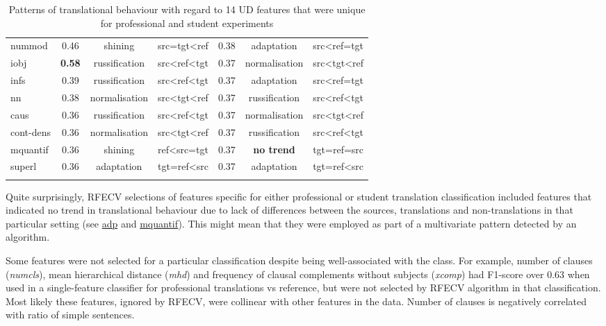 \begin{longtable}[H]{p{1.84cm}|ccc||ccc}
	nummod        & 0.46 & shining       & src=tgt\textless{}ref           & 0.38 & adaptation    & src\textless{}ref=tgt           \\
	iobj          & \textbf{0.58} & russification & src\textless{}ref\textless{}tgt & 0.37 & normalisation & src\textless{}tgt\textless{}ref \\
	infs          & 0.39 & russification & src\textless{}ref\textless{}tgt & 0.37 & adaptation    & src\textless{}ref=tgt           \\
	nn            & 0.38 & normalisation & src\textless{}tgt\textless{}ref & 0.37 & russification & src\textless{}ref\textless{}tgt \\
	caus          & 0.36 & russification & src\textless{}ref\textless{}tgt & 0.37 & normalisation & src\textless{}tgt\textless{}ref \\
	cont-dens & 0.36 & normalisation & src\textless{}tgt\textless{}ref & 0.37 & russification & src\textless{}ref\textless{}tgt \\
	mquantif      & 0.36 & shining       & ref\textless{}src=tgt           & 0.37 & \textbf{no trend}       & tgt=ref=src                     \\
	superl        & 0.36 & adaptation    & tgt=ref\textless{}src           & 0.37 & adaptation    & tgt=ref\textless{}src  \\
	\bottomrule
	\caption{\label{tab:spec_rfecv_feats}Patterns of translational behaviour with regard to 14 UD features that were unique for professional and student experiments}\\
\end{longtable}	

Quite surprisingly, RFECV selections of features specific for either professional or student translation classification included features that indicated no trend in translational behaviour due to lack of differences between the sources, translations and non-translations in that particular setting (see \hyperlink{ft:adp}{adp} and \hyperlink{ft:mquantif}{mquantif}). This might mean that they were employed as part of a multivariate pattern detected by an algorithm.

Some features were not selected for a particular classification despite being well-associated with the class. For example, number of clauses (\textit{numcls}), mean hierarchical distance (\textit{mhd}) and frequency of clausal complements without subjects (\textit{xcomp}) had F1-score over 0.63 when used in a single-feature classifier for professional translations vs reference, but were not selected by RFECV algorithm in that classification. Most likely these features, ignored by RFECV, were collinear with other features in the data. Number of clauses is negatively correlated with ratio of simple sentences. 

